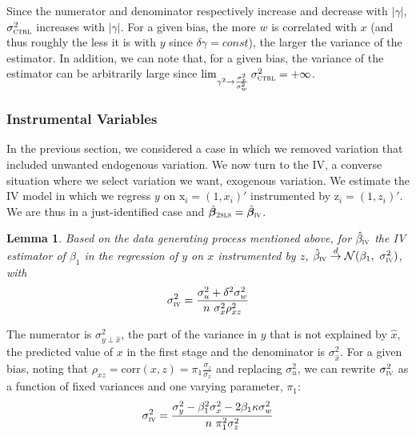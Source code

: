 \documentclass[usletter, 12pt]{article}
\newtheorem{lemma}{Lemma}
\begin{document}
				Since the numerator and denominator respectively increase and decrease with $|\gamma|$,  $\sigma_{\textsc{ctrl}}^{2}$ increases with $|\gamma|$. For a given bias, the more $w$ is correlated with $x$ (and thus roughly the less it is with $y$ since $\delta \gamma = const$), the larger the variance of the estimator. In addition, we can note that, for a given bias, the variance of the estimator can be arbitrarily large since $\lim_{\gamma^{2} \to \frac{\sigma_{x}^{2}}{\sigma_{w}^{2}}} \sigma_{\textsc{ctrl}}^{2} = + \infty$.
				
			
		
		\subsubsection{Instrumental Variables}
		
			In the previous section, we considered a case in which we removed variation that included unwanted endogenous variation. We now turn to the IV, a converse situation where we select variation we want, exogenous variation. We estimate the IV model in which we regress $y$ on $\text{x}_{i} = (1, x_{i})'$ instrumented by $\text{z}_{i} = (1, z_{i})'$. We are thus in a just-identified case and $\hat{\bm{\beta}}_{\textsc{2sls}} = \hat{\bm{\beta}}_{\textsc{iv}}$.						
			\begin{lemma}\label{lemma_iv}
				Based on the data generating process mentioned above, for $\hat{\beta}_{\textsc{iv}}$ the IV estimator of $\beta_{1}$ in the regression of $y$ on $x$ instrumented by $z$,  $\hat{\beta}_{\textsc{iv}} \overset{d}{\to} \mathcal{N}(\beta_{1}, \ \sigma_{\textsc{iv}}^{2})$, with
					\[
						\sigma_{\textsc{iv}}^{2} = \dfrac{\sigma_{u}^{2} + \delta^{2}\sigma_{w}^{2}}{n \ \sigma_{x}^{2} \rho_{xz}^{2}}
					\]
			\end{lemma}
			
			The numerator is $\sigma_{y \perp \hat{x}}^{2}$, the part of the variance in $y$ that is not explained by $\hat{x}$, the predicted value of $x$ in the first stage and the denominator is $\sigma_{\hat{x}}^{2}$. For a given bias, noting that $\rho_{xz} = \text{corr}(x, z) = \pi_1 \frac{\sigma_z}{\sigma_x}$ and replacing $\sigma_{u}^{2}$, we can rewrite $\sigma_{\textsc{iv}}^{2}$ as a function of fixed variances and one varying parameter, $\pi_{1}$:
			\[
				\sigma_{\textsc{iv}}^{2} = \dfrac{\sigma_{y}^{2} - \beta_{1}^{2}\sigma_{x}^{2} - 2\beta_{1}\kappa \sigma_{w}^{2}}{n \ \pi_{1}^{2} \sigma_{z}^{2}}
			\]
			
\end{document}
